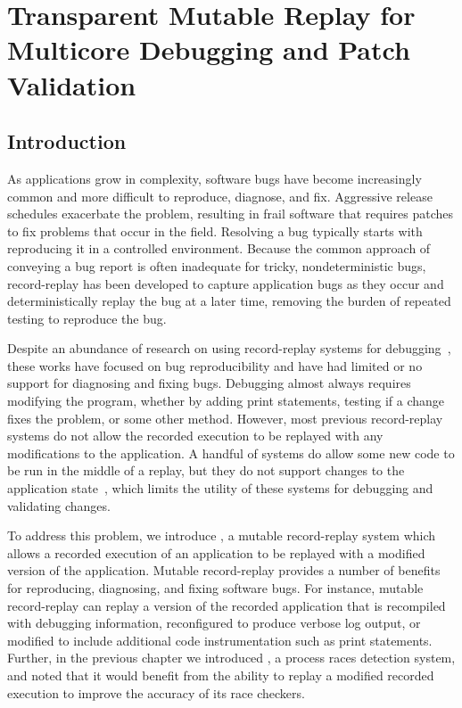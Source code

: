\chapter{Transparent Mutable Replay for Multicore Debugging and Patch Validation}
\label{ch:dora}

\section{Introduction}

As applications grow in complexity, software bugs have become
increasingly common and more difficult to reproduce, diagnose, and fix.
Aggressive release schedules
exacerbate the problem, resulting in frail software that requires patches to
fix problems that occur in the field. Resolving a bug typically starts with
reproducing it in a controlled environment. Because the common approach of conveying a bug
report is often inadequate for tricky, nondeterministic bugs, record-replay has been developed to
capture application bugs as they occur and
deterministically replay the bug at a later time, removing the burden of
repeated testing to reproduce the bug.

Despite an abundance of research on using record-replay systems for 
debugging~\cite{idna:vee06,instant-replay,r2:osdi,odr:sosp09,pinsel:pldi07,pres:sosp09,jockey,srinivasan:flashback,subhraveti:sigmetrics11}, these works have
focused on bug reproducibility and have had limited or no support for diagnosing
and fixing bugs.
Debugging almost always requires modifying the program, whether by
adding print statements, testing if a change fixes the problem, or
some other method.
However, most previous record-replay systems do not allow the recorded execution
to be replayed with any modifications to the application.
A handful of systems do allow some new code to be run in the middle of a replay,
but they do not support changes to the application
state~\cite{intrusions:sosp05,decouple:usenix08},
which limits the utility of these systems for debugging and validating changes.

To address this problem, we introduce {\dora}, a mutable
record-replay system which allows a recorded execution of an
application to be replayed with a modified version
of the application. Mutable record-replay provides a
number of benefits for reproducing, diagnosing, and fixing software
bugs. For instance, mutable record-replay can replay a version
of the recorded application that is recompiled with debugging information,
reconfigured to produce verbose log output, or modified to include additional
code instrumentation such as print statements.
Further, in the previous chapter we introduced \racepro, a process races
detection system, and noted that it would benefit from the ability to replay a
modified recorded execution to improve the accuracy of its race checkers.

